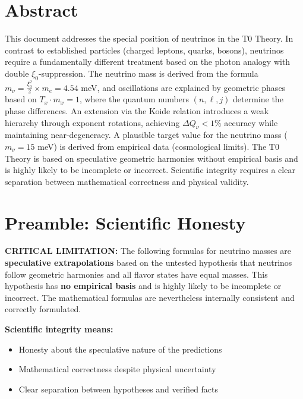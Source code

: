 \section*{Abstract}
		This document addresses the special position of neutrinos in the T0 Theory. In contrast to established particles (charged leptons, quarks, bosons), neutrinos require a fundamentally different treatment based on the photon analogy with double $\xi_0$-suppression. The neutrino mass is derived from the formula $m_\nu = \frac{\xi_0^2}{2} \times m_e = 4.54$ meV, and oscillations are explained by geometric phases based on $T_x \cdot m_x = 1$, where the quantum numbers $(n, \ell, j)$ determine the phase differences. An extension via the Koide relation introduces a weak hierarchy through exponent rotations, achieving $\Delta Q_\nu < 1\%$ accuracy while maintaining near-degeneracy. A plausible target value for the neutrino mass ($m_\nu = 15$ meV) is derived from empirical data (cosmological limits). The T0 Theory is based on speculative geometric harmonies without empirical basis and is highly likely to be incomplete or incorrect. Scientific integrity requires a clear separation between mathematical correctness and physical validity.

	
	
	\section{Preamble: Scientific Honesty}
	
	\begin{warning}
		\textbf{CRITICAL LIMITATION:} The following formulas for neutrino masses are \textbf{speculative extrapolations} based on the untested hypothesis that neutrinos follow geometric harmonies and all flavor states have equal masses. This hypothesis has \textbf{no empirical basis} and is highly likely to be incomplete or incorrect. The mathematical formulas are nevertheless internally consistent and correctly formulated.
		
		\vspace{0.5cm}
		\textbf{Scientific integrity means:}
		\begin{itemize}
			\item Honesty about the speculative nature of the predictions
			\item Mathematical correctness despite physical uncertainty
			\item Clear separation between hypotheses and verified facts
		\end{itemize}
	\end{warning}
	
